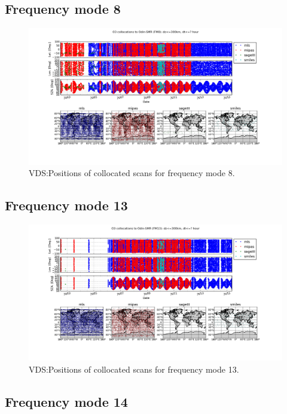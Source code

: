 \subsection{Frequency mode 8}

\begin{figure}[t]
\centering
\includegraphics[width=17cm]{test_collocation_fm8.png}
\caption{VDS:Positions of collocated scans for frequency mode 8.}
\label{fig:vdsfm1}
\end{figure}

\clearpage
\newpage

\subsection{Frequency mode 13}

\begin{figure}[t]
\centering
\includegraphics[width=17cm]{test_collocation_fm13.png}
\caption{VDS:Positions of collocated scans for frequency mode 13.}
\label{fig:vdsfm1}
\end{figure}

\clearpage
\newpage

\subsection{Frequency mode 14}

